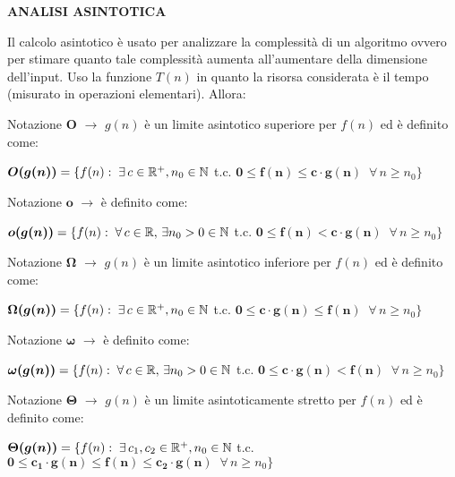 \documentclass[8pt]{extarticle}
\begin{document}
\begin{formulario}
	\begin{tcenter}
\textbf{ANALISI ASINTOTICA}
	\end{tcenter}
Il calcolo asintotico è usato per analizzare la complessità di un algoritmo ovvero per stimare quanto tale complessità aumenta all’aumentare della dimensione dell’input. Uso la funzione $T(n)$ in quanto la risorsa considerata è il tempo (misurato in operazioni elementari). Allora:
	\begin{descr}{0}
	
\item[Notazione $\bm{O}$] $\rightarrow$ $g(n)$ è un limite asintotico superiore per $f(n)$ ed è definito come:
		\begin{tcenter}
$\bm{O(g(n))} =\{ f(n): \; \exists \, c\in\mathbb{R}^+ ,n_0\in\mathbb{N} $ t.c. $ \bm{0\leq f(n)\leq c\cdot g(n)} \;\; \forall\, n\geq n_0 \}$
		\end{tcenter} 
		
\item[Notazione $\bm{o}$] $\rightarrow$ è definito come:
		\begin{tcenter}
$\bm{o(g(n))} =\{ f(n): \; \forall \, c\in\mathbb{R} ,\,\exists n_0>0\in\mathbb{N} $ t.c. $ \bm{0\leq f(n)< c\cdot g(n)} \;\; \forall\, n\geq n_0 \}$
		\end{tcenter} 
		
\item[Notazione $\bm{\Omega}$] $\rightarrow$ $g(n)$ è un limite asintotico inferiore per $f(n)$ ed è definito come:
		\begin{tcenter}
$\bm{\Omega(g(n))} =\{ f(n): \; \exists \, c\in\mathbb{R}^+ ,n_0\in\mathbb{N} $ t.c. $ \bm{0\leq c\cdot g(n)\leq f(n)} \;\; \forall\, n\geq n_0 \}$
		\end{tcenter} 		
		
\item[Notazione $\bm{\omega}$] $\rightarrow$ è definito come:
		\begin{tcenter}
$\bm{\omega(g(n))} =\{ f(n): \; \forall \, c\in\mathbb{R} ,\,\exists n_0>0\in\mathbb{N} $ t.c. $ \bm{0\leq c\cdot g(n)< f(n)} \;\; \forall\, n\geq n_0 \}$
		\end{tcenter}

\item[Notazione $\bm{\Theta}$] $\rightarrow$ $g(n)$ è un limite asintoticamente stretto per $f(n)$ ed è definito come:
		\begin{tcenter}
$\bm{\Theta(g(n))} =\{ f(n): \; \exists \, c_1,c_2\in\mathbb{R}^+ ,n_0\in\mathbb{N} $ t.c. $ \bm{0\leq c_1\cdot g(n)\leq f(n)\leq c_2\cdot g(n)} \;\; \forall\, n\geq n_0 \}$
		\end{tcenter} 
	\end{descr}
	

\end{formulario}
\end{document}
